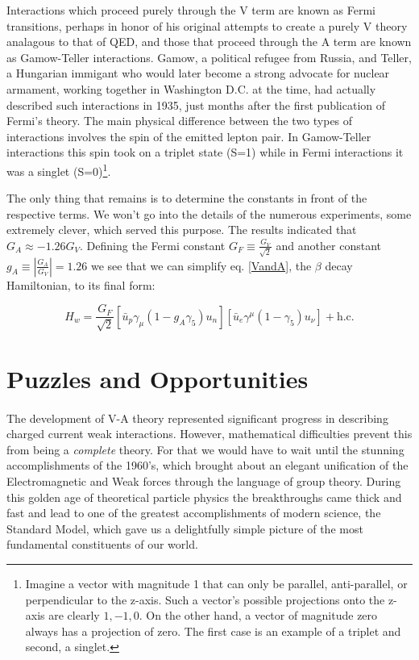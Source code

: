 \documentclass[12pt]{book}
\begin{document}
Interactions which proceed purely through the V term are known as Fermi transitions, perhaps in honor of his original attempts to create a purely V theory analagous to that of QED, and those that proceed through the A term are known as Gamow-Teller interactions. Gamow, a political refugee from Russia, and Teller, a Hungarian immigant who would later become a strong advocate for nuclear armament, working together in Washington D.C. at the time, had actually described such interactions in 1935, just months after the first publication of Fermi's theory. The main physical difference between the two types of interactions involves the spin of the emitted lepton pair. In Gamow-Teller interactions this spin took on a triplet state (S=1) while in Fermi interactions it was a singlet (S=0)\footnote{Imagine a vector with magnitude 1 that can only be parallel, anti-parallel, or perpendicular to the z-axis. Such a vector's possible projections onto the z-axis are clearly $1, -1, 0$. On the other hand, a vector of magnitude zero always has a projection of zero. The first case is an example of a triplet and second, a singlet.}.

The only thing that remains is to determine the constants in front of the respective terms. We won't go into the details of the numerous experiments, some extremely clever, which served this purpose. The results indicated that $G_{A}\approx -1.26G_{V}$. Defining the Fermi constant $G_{F}\equiv \frac{G_{V}}{\sqrt{2}}$ and another constant $g_{A}\equiv \left|\frac{G_{A}}{G_{V}}\right|=1.26$ we see that we can simplify eq. \ref{VandA}, the $\beta$ decay Hamiltonian, to its final form:

\begin{equation}\label{VminA}
\boxed{
H_{w}=\frac{G_{F}}{\sqrt{2}}\left[\bar{u}_{p}\gamma_{\mu}\left(1-g_{A}\gamma_{5}\right)u_{n}\right]\left[\bar{u}_{e}\gamma^{\mu}\left(1-\gamma_{5}\right)u_{\nu}\right]+\text{h.c.}
} 
\end{equation}

\section{Puzzles and Opportunities}

\paragraph{}The development of V-A theory represented significant progress in describing charged current weak interactions. However, mathematical difficulties prevent this from being a \emph{complete} theory. For that we would have to wait until the stunning accomplishments of the 1960's, which brought about an elegant unification of the Electromagnetic and Weak forces through the language of group theory. During this golden age of theoretical particle physics the breakthroughs came thick and fast and lead to one of the greatest accomplishments of modern science, the Standard Model, which gave us a delightfully simple picture of the most fundamental constituents of our world.
\end{document}

